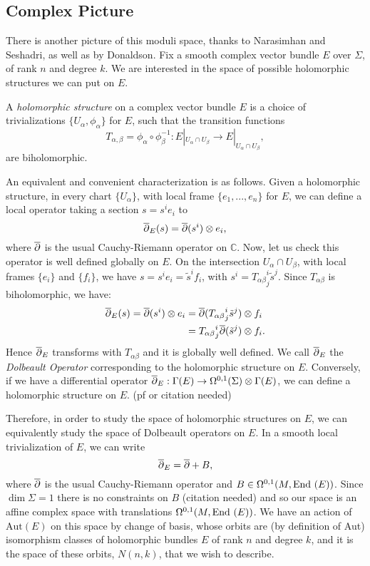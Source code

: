 	\subsection{Complex Picture}
	There is another picture of this moduli space, thanks to Narasimhan and Seshadri, as well as by Donaldson. Fix a smooth complex vector bundle $E$ over $\Sigma$, of rank $n$ and degree $k$. We are interested in the space of possible holomorphic structures we can put on $E$.
	\begin{definition}
		A \textit{holomorphic structure} on a complex vector bundle $E$ is a choice of trivializations $\{U_\alpha, \phi_\alpha\}$ for $E$, such that the transition functions
		\begin{equation*}
			T_{\alpha,\beta} = \phi_\alpha \circ \phi^{-1}_\beta: E|_{U_\alpha \cap U_\beta} \to E|_{U_\alpha \cap U_\beta},
		\end{equation*}
		are biholomorphic. 
	\end{definition}
	 An equivalent and convenient characterization is as follows. Given a holomorphic structure, in every chart $\{U_\alpha\}$, with local frame $\{e_1,...,e_n\}$ for $E$, we can define a local operator taking a section $s = s^i e_i$ to
	\begin{equation*}
		\overline{\partial}_E(s) = \overline{\partial}(s^i)\otimes e_i,
	\end{equation*}
	where $\overline{\partial}$ is the usual Cauchy-Riemann operator on $\mathbb{C}$. Now, let us check this operator is well defined globally on $E$. On the intersection $U_\alpha \cap U_\beta$, with local frames $\{e_i\}$ and $\{f_i\}$, we have $s = s^i e_i = \tilde{s}^i f_i$, with $s^i = {T_{\alpha\beta}}^i_j\tilde{s}^j.$ Since $T_{\alpha\beta}$ is biholomorphic, we have:
	\begin{align*}
		\overline{\partial}_E(s) = \overline{\partial}(s^i)\otimes e_i &= \overline{\partial}({T_{\alpha\beta}}^i_j \tilde{s}^j)\otimes f_i\\
		&= {T_{\alpha\beta}}^i_j \overline{\partial}(\tilde{s}^j)\otimes f_i.
	\end{align*}
	Hence $\overline{\partial}_E$ transforms with $T_{\alpha\beta}$ and it is globally well defined. We call $\overline{\partial}_E$ the \textit{Dolbeault Operator} corresponding to the holomorphic structure on $E$. Conversely, if we have a differential operator $\overline{\partial}_E:\Gamma(E) \to \Omega^{0,1}(\Sigma)\otimes \Gamma(E)$, we can define a holomorphic structure on $E$. (pf or citation needed)
	
	Therefore, in order to study the space of holomorphic structures on $E$, we can equivalently study the space of Dolbeault operators on $E$. In a smooth local trivialization of $E$, we can write 
	\begin{equation*}
		\overline{\partial}_E = \overline{\partial} + B,
	\end{equation*}
	where $\overline{\partial}$ is the usual Cauchy-Riemann operator and $B \in \Omega^{0,1}(M, \text{End }(E))$. Since $\dim \Sigma = 1$ there is no constraints on $B$ (citation needed) and so our space is an affine complex space with translations $\Omega^{0,1}(M,\text{End }(E))$. We have an action of $\text{Aut}(E)$ on this space by change of basis, whose orbits are (by definition of Aut) isomorphism classes of holomorphic bundles $E$ of rank $n$ and degree $k$, and it is the space of these orbits, $N(n,k)$, that we wish to describe. 
	
